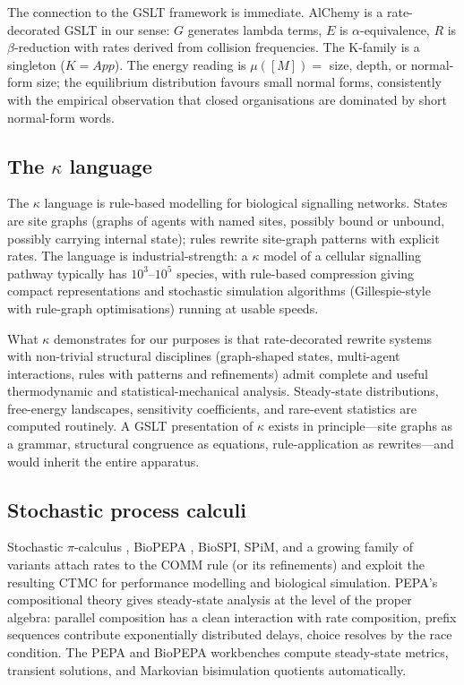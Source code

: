 \documentclass[11pt]{article}
\theoremstyle{plain}
\theoremstyle{definition}
\theoremstyle{remark}
\begin{document}
The connection to the GSLT framework is immediate. AlChemy is a rate-decorated GSLT in our sense: $G$ generates lambda terms, $E$ is $\alpha$-equivalence, $R$ is $\beta$-reduction with rates derived from collision frequencies. The K-family is a singleton ($K = \mathit{App}$). The energy reading is $\mu([M]) = $ size, depth, or normal-form size; the equilibrium distribution favours small normal forms, consistently with the empirical observation that closed organisations are dominated by short normal-form words.

\subsection{The $\kappa$ language}

The $\kappa$ language \cite{Danos07Scalable,Danos08Rule} is rule-based modelling for biological signalling networks. States are site graphs (graphs of agents with named sites, possibly bound or unbound, possibly carrying internal state); rules rewrite site-graph patterns with explicit rates. The language is industrial-strength: a $\kappa$ model of a cellular signalling pathway typically has $10^3$--$10^5$ species, with rule-based compression giving compact representations and stochastic simulation algorithms (Gillespie-style \cite{Gillespie77} with rule-graph optimisations) running at usable speeds.

What $\kappa$ demonstrates for our purposes is that rate-decorated rewrite systems with non-trivial structural disciplines (graph-shaped states, multi-agent interactions, rules with patterns and refinements) admit complete and useful thermodynamic and statistical-mechanical analysis. Steady-state distributions, free-energy landscapes, sensitivity coefficients, and rare-event statistics are computed routinely. A GSLT presentation of $\kappa$ exists in principle---site graphs as a grammar, structural congruence as equations, rule-application as rewrites---and would inherit the entire apparatus.

\subsection{Stochastic process calculi}

Stochastic $\pi$-calculus \cite{Priami95}, BioPEPA \cite{CiocchettaHillston09}, BioSPI, SPiM, and a growing family of variants attach rates to the COMM rule (or its refinements) and exploit the resulting CTMC for performance modelling and biological simulation. PEPA's compositional theory gives steady-state analysis at the level of the proper algebra: parallel composition has a clean interaction with rate composition, prefix sequences contribute exponentially distributed delays, choice resolves by the race condition. The PEPA and BioPEPA workbenches \cite{Hillston96,CiocchettaHillston09} compute steady-state metrics, transient solutions, and Markovian bisimulation quotients automatically.
\end{document}
